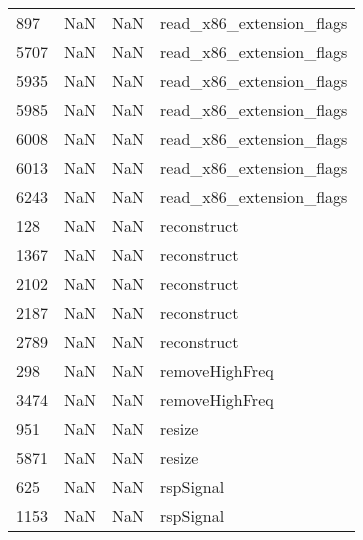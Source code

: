 \begin{tabular}{llll}
897  &                   NaN &                        NaN &                  read\_x86\_extension\_flags \\
5707 &                   NaN &                        NaN &                  read\_x86\_extension\_flags \\
5935 &                   NaN &                        NaN &                  read\_x86\_extension\_flags \\
5985 &                   NaN &                        NaN &                  read\_x86\_extension\_flags \\
6008 &                   NaN &                        NaN &                  read\_x86\_extension\_flags \\
6013 &                   NaN &                        NaN &                  read\_x86\_extension\_flags \\
6243 &                   NaN &                        NaN &                  read\_x86\_extension\_flags \\
128  &                   NaN &                        NaN &                               reconstruct \\
1367 &                   NaN &                        NaN &                               reconstruct \\
2102 &                   NaN &                        NaN &                               reconstruct \\
2187 &                   NaN &                        NaN &                               reconstruct \\
2789 &                   NaN &                        NaN &                               reconstruct \\
298  &                   NaN &                        NaN &                            removeHighFreq \\
3474 &                   NaN &                        NaN &                            removeHighFreq \\
951  &                   NaN &                        NaN &                                    resize \\
5871 &                   NaN &                        NaN &                                    resize \\
625  &                   NaN &                        NaN &                                 rspSignal \\
1153 &                   NaN &                        NaN &                                 rspSignal \\

\end{tabular}
